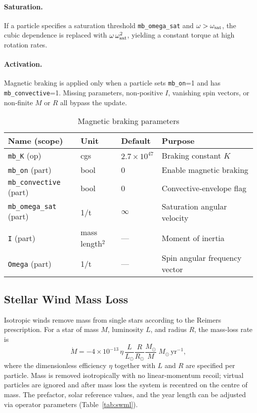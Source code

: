 \documentclass[11pt]{article}
\begin{document}
\paragraph{Saturation.} If a particle specifies a saturation threshold
\texttt{mb\_omega\_sat} and $\omega>\omega_{\rm sat}$, the cubic dependence is
replaced with $\omega\,\omega_{\rm sat}^2$, yielding a constant torque at high
rotation rates.

\paragraph{Activation.} Magnetic braking is applied only when a particle sets
\texttt{mb\_on}=1 and has \texttt{mb\_convective}=1. Missing parameters,
non‑positive $I$, vanishing spin vectors, or non‑finite $M$ or $R$ all
bypass the update.

\begin{table}[h]
\centering\footnotesize
\caption{Magnetic braking parameters}
\label{tab:mb}
\begin{tabular}{@{}llll@{}}
\toprule
Name (scope) & Unit & Default & Purpose \\
\midrule
\texttt{mb\_K} (op) & cgs & $2.7\times10^{47}$ & Braking constant $K$\\
\texttt{mb\_on} (part) & bool & 0 & Enable magnetic braking\\
\texttt{mb\_convective} (part) & bool & 0 & Convective‑envelope flag\\
\texttt{mb\_omega\_sat} (part) & 1/t & $\infty$ & Saturation angular velocity\\
\texttt{I} (part) & mass\,length$^2$ & — & Moment of inertia\\
\texttt{Omega} (part) & 1/t & — & Spin angular frequency vector\\
\bottomrule
\end{tabular}
\end{table}

\subsection{Stellar Wind Mass Loss}
\label{sec:swml}

Isotropic winds remove mass from single stars according to the
Reimers prescription. For a star of mass $M$, luminosity $L$, and radius
$R$, the mass-loss rate is
\[
\dot M = -4\times10^{-13}\,\eta\,\frac{L}{L_\odot}\frac{R}{R_\odot}\frac{M_\odot}{M}
\;M_\odot\,\mathrm{yr}^{-1},
\]
where the dimensionless efficiency $\eta$ together with $L$ and $R$ are
specified per particle. Mass is removed isotropically with no linear-momentum
recoil; virtual particles are ignored and after mass loss the system is
recentred on the centre of mass. The prefactor, solar reference values, and
the year length can be adjusted via operator parameters
(Table~\ref{tab:swml}).
\end{document}
